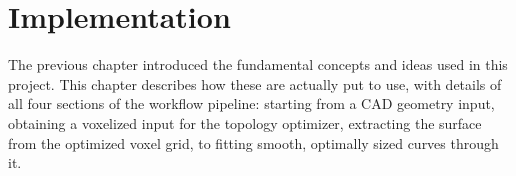 \chapter{Implementation}
\label{chapter:Implementation}	
The previous chapter introduced the fundamental concepts and ideas used in this project. This chapter describes how these are actually put to use, with details of all four sections of the workflow pipeline: starting from a CAD geometry input, obtaining a voxelized input for the topology optimizer, extracting the surface from the optimized voxel grid, to fitting smooth, optimally sized curves through it.















